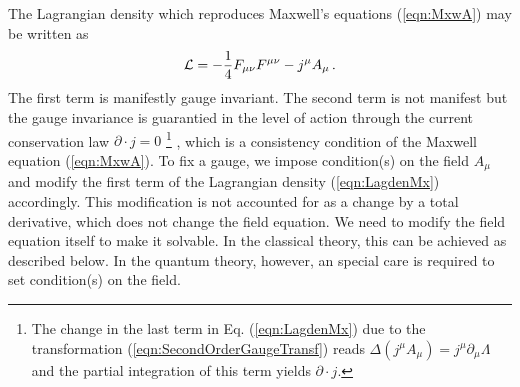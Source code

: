 The Lagrangian density which
 reproduces Maxwell's equations (\ref{eqn:MxwA}) may be written as
\begin{eqnarray}
{\cal L} = -\frac{1}{4}F_{\mu \nu} F^{\mu \nu} - j^\mu A_\mu
\,.
\label{eqn:LagdenMx}
\end{eqnarray}
The first term is manifestly gauge invariant.
The second term is not manifest but
the gauge invariance is guarantied in the level of action
through the current conservation law
$\partial \cdot j = 0$
\footnote{%
The change in the last term in Eq. (\ref{eqn:LagdenMx}) 
due to the transformation (\ref{eqn:SecondOrderGaugeTransf}) reads
$\Delta(j^\mu A_\mu) = j^\mu \partial_\mu \Lambda$
and the partial integration of this term yields $\partial \cdot j$.
}%
, which is a consistency condition of the Maxwell equation
(\ref{eqn:MxwA}).
To fix a gauge, we impose condition(s) on the field $A_\mu$ and
modify the first term of the Lagrangian density (\ref{eqn:LagdenMx})
accordingly. This modification is not accounted for as a change by
a total derivative, which does not change the field equation.
We need to modify the field equation itself to make it solvable.
In the classical theory, this can be achieved as described below.
In the quantum theory, however, 
an special care is required to set condition(s) on the field.

